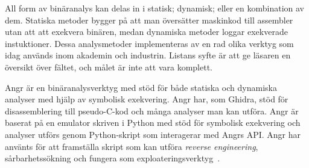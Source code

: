 All form av binäranalys kan delas in i statisk; dynamisk; eller en kombination
av dem\cite{andriesse2018}. Statiska metoder bygger på att man översätter
maskinkod till assembler utan att att exekvera binären, medan dynamiska
metoder loggar exekverade instuktioner\cite{andriesse2018}. Dessa analysmetoder
implementeras av en rad olika verktyg som idag används inom akademin och
industrin. Listans syfte är att ge läsaren en översikt över fältet, och målet är
inte att vara komplett.



Angr är en binäranalysverktyg med stöd för både statiska och dynamiska analyser
med hjälp av symbolisk exekvering. Angr har, som Ghidra, stöd för
disassemblering till pseudo-C-kod och många analyser man kan utföra. Angr är
baserat på en emulator skriven i Python med stöd för symbolisk exekvering och
analyser utförs genom Python-skript som interagerar med Angrs API. Angr har
använts för att framställa skript som kan utföra \emph{reverse engineering},
sårbarhetssökning och fungera som exploateringsverktyg~\cite{angr_docs}.
